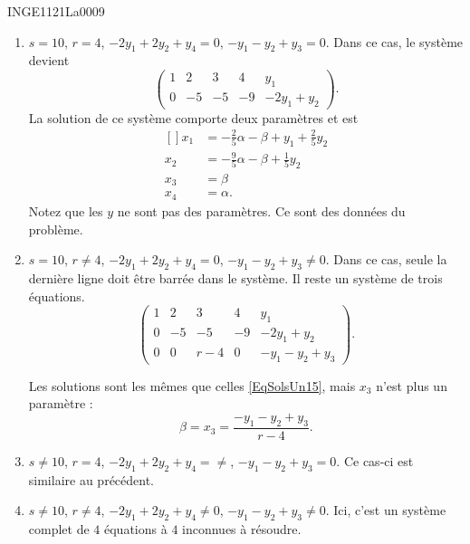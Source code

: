 \begin{corrige}{INGE1121La0009}
\begin{enumerate}
		\item
			$s=10$, $r=4$, $-2y_1+2y_2+y_4=0$, $-y_1-y_2+y_3=0$. 
			Dans ce cas, le système devient
			\begin{equation}
				\left(\begin{array}{cccc|c}
					1	&	2	&	3	&	4	&	y_1	\\
					0	&	-5	&	-5	&	-9	&	-2y_1+y_2
				\end{array}\right).
			\end{equation}
			La solution de ce système comporte deux paramètres et est
			\begin{equation}		\label{EqSolsUn15}
				\begin{aligned}[]
					x_1&=-\frac{ 2 }{ 5 }\alpha-\beta+y_1+\frac{ 2 }{ 5 }y_2\\
					x_2&=-\frac{ 9 }{ 5 }\alpha-\beta+\frac{1}{ 5 }y_2\\
					x_3&=\beta\\
					x_4&=\alpha.
				\end{aligned}
			\end{equation}
			Notez que les $y$ ne sont pas des paramètres. Ce sont des données du problème.
		\item
			$s=10$, $r\neq 4$, $-2y_1+2y_2+y_4=0$, $-y_1-y_2+y_3\neq 0$. Dans ce cas, seule la dernière ligne doit être barrée dans le système. Il reste un système de trois équations. 
			\begin{equation}
				\left(\begin{array}{cccc|c}
					1	&	2	&	3	&	4	&	y_1	\\
					0	&	-5	&	-5	&	-9	&	-2y_1+y_2\\
					0	&	0	&	r-4	&	0	&	-y_1-y_2+y_3
				\end{array}\right).
			\end{equation}
			
			
			Les solutions sont les mêmes que celles \eqref{EqSolsUn15}, mais $x_3$ n'est plus un paramètre :
			\begin{equation}
				\beta=x_3=\frac{ -y_1-y_2+y_3 }{ r-4 }.
			\end{equation}
		\item
			$s\neq 10$, $r= 4$, $-2y_1+2y_2+y_4=\neq $, $-y_1-y_2+y_3=0$. Ce cas-ci est similaire au précédent.

		\item
			$s\neq 10$, $r\neq 4$, $-2y_1+2y_2+y_4\neq 0$, $-y_1-y_2+y_3\neq 0$. Ici, c'est un système complet de $4$ équations à $4$ inconnues à résoudre.

	\end{enumerate}

\end{corrige}

